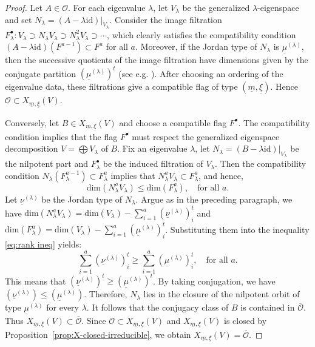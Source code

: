 \documentclass[11pt]{amsart}
\theoremstyle{plain}
\theoremstyle{definition}
\theoremstyle{remark}
\newcommand{\id}{\mathrm{id}}
\def\dim{\mathrm{dim}}
\def\uxi{{\underline{\xi}}}
\def\um{{\underline{m}}}
\begin{document}
\begin{proof}
Let $A\in\mathcal O$. For each eigenvalue $\lambda$, let $V_\lambda$ be the generalized $\lambda$-eigenspace and set $N_\lambda=(A-\lambda\id)|_{V_\lambda}$. Consider the image filtration $F^\bullet_\lambda: V_\lambda\supset N_\lambda V_\lambda\supset N_\lambda^2V_\lambda\supset\cdots$, which clearly satisfies the compatibility condition $(A-\lambda \id)(F^{a-1}) \subset F^a$ for all $a.$ Moreover, if the Jordan type of $N_\lambda$ is $\underline{\mu}^{(\lambda)}$, then the successive quotients of the image filtration have dimensions given by the conjugate partition $(\underline{\mu}^{(\lambda)})^t$ (see e.g. \cite[Remark 2.4]{LeeLee2025}). After choosing an ordering of the eigenvalue data, these filtrations give a compatible flag of type $(\um,\uxi)$. Hence $\mathcal O\subset X_{\um,\uxi}(V)$. 

Conversely, let $B\in X_{\um,\uxi}(V)$ and choose a compatible flag $F^\bullet$. The compatibility condition implies that the flag $F^\bullet$ must respect the generalized eigenspace decomposition $V=\bigoplus V_{\lambda}$ of $B$. Fix an eigenvalue $\lambda$, let $N_\lambda=(B-\lambda\id)|_{V_\lambda}$ be the nilpotent part and $F^\bullet_\lambda$ be the induced filtration of $V_\lambda$. Then the compatibility condition $N_\lambda(F^{a-1}_\lambda)\subset F^a_\lambda$ implies that $N_\lambda^aV_\lambda\subset F^a_\lambda$, and hence, 
\begin{equation}\label{eq:rank ineq}
\dim(N_\lambda^aV_\lambda)\leq \dim (F^a_\lambda), \quad \textrm{for all }a.
\end{equation}
Let $\underline{\nu}^{(\lambda)}$ be the Jordan type of $N_\lambda$. Argue as in the preceding paragraph, we have $\dim(N_\lambda^aV_\lambda) = \dim (V_\lambda) - \sum_{i=1}^a (\underline{\nu}^{(\lambda)})_i^t$ and $\dim(F^a_\lambda) = \dim(V_\lambda) - \sum_{i=1}^a (\underline{\mu}^{(\lambda)})_i^t$. Substituting them into the inequality \ref{eq:rank ineq} yields: 
\begin{equation*}
    \sum_{i=1}^a (\underline{\nu}^{(\lambda)})^t_i \geq \sum_{i=1}^a (\underline{\mu}^{(\lambda)})^t_i, \quad \textrm{for all }a.
\end{equation*}
This means that $(\underline{\nu}^{(\lambda)})^t\geq (\underline{\mu}^{(\lambda)})^t$. By taking conjugation, we have $(\underline{\nu}^{(\lambda)})\leq (\underline{\mu}^{(\lambda)})$. Therefore, $N_\lambda$ lies in the closure of the nilpotent orbit of type $\underline{\mu}^{(\lambda)}$ for every $\lambda$. It follows that the conjugacy class of $B$ is contained in $\overline{\mathcal O}$. Thus $X_{\um,\uxi}(V)\subset \overline{\mathcal O}$. Since $\mathcal O\subset X_{\um,\uxi}(V)$ and $X_{\um,\uxi}(V)$ is closed by Proposition~\ref{prop:X-closed-irreducible}, we obtain $X_{\um,\uxi}(V)=\overline{\mathcal O}$. 


\end{proof}
\end{document}
